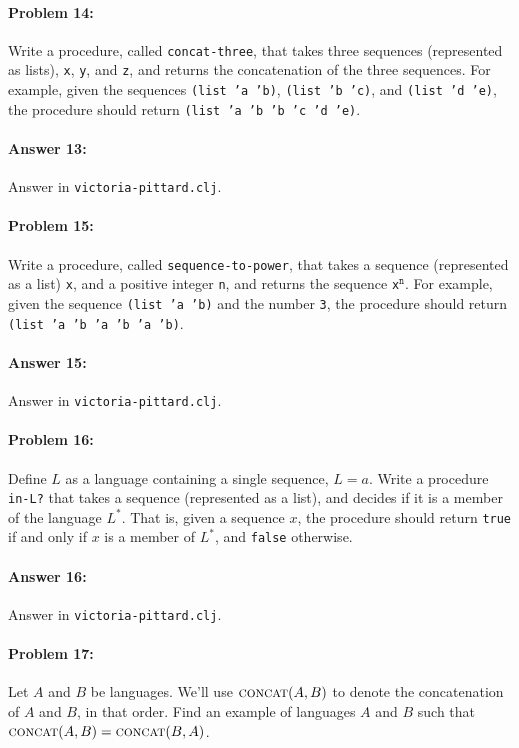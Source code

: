 \documentclass[10pt]{article}
\begin{document}
\hrulefill
\paragraph{Problem 14:}
Write a procedure, called \texttt{concat-three}, that takes three
sequences (represented as lists), \texttt{x}, \texttt{y}, and
\texttt{z}, and returns the concatenation of the three sequences. For
example, given the sequences \texttt{(list 'a 'b)}, \texttt{(list 'b
  'c)}, and \texttt{(list 'd 'e)}, the procedure should return
\texttt{(list 'a 'b 'b 'c 'd 'e)}.

\paragraph{Answer 13:} Answer in \texttt{victoria-pittard.clj}.

\hrulefill
\paragraph{Problem 15:}
Write a procedure, called \texttt{sequence-to-power}, that takes a
sequence (represented as a list) \texttt{x}, and a positive integer
\texttt{n}, and returns the sequence \texttt{x}$^\texttt{n}$. For
example, given the sequence \texttt{(list 'a 'b)} and the number
\texttt{3}, the procedure should return \texttt{(list 'a 'b 'a 'b 'a
  'b)}.

\paragraph{Answer 15:} Answer in \texttt{victoria-pittard.clj}.

\hrulefill
\paragraph{Problem 16:}
Define $L$ as a language containing a single sequence,
$L={a}$. Write a procedure \texttt{in-L?} that takes a sequence
(represented as a list), and decides if it is a member of the language
$L^*$. That is, given a sequence $x$, the procedure should return
\texttt{true} if and only if $x$ is a member of $L^*$, and
\texttt{false} otherwise.

\paragraph{Answer 16:}Answer in \texttt{victoria-pittard.clj}.

\hrulefill
\paragraph{Problem 17:}
Let $A$ and $B$ be languages. We'll use $\textsc{concat}(A,B)$ to
denote the concatenation of $A$ and $B$, in that order. Find an
example of languages $A$ and $B$ such that
$\textsc{concat}(A,B)=\textsc{concat}(B,A)$.
\end{document}
